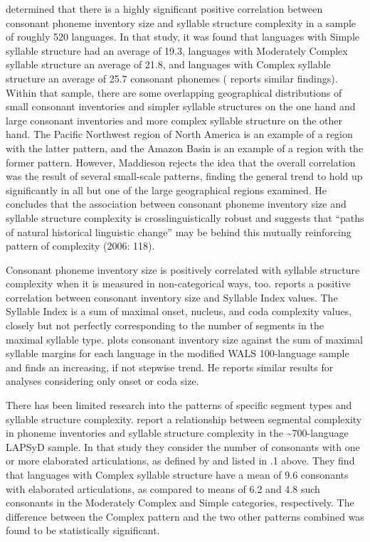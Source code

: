   \citet{Maddieson2006} determined that there is a highly significant positive correlation between consonant phoneme inventory size and syllable structure complexity in a sample of roughly 520 languages. In that study, it was found that languages with Simple syllable structure had an average of 19.3, languages with Moderately Complex syllable structure an average of 21.8, and languages with Complex syllable structure an average of 25.7 consonant phonemes (\citealt{Maddieson2013a} reports similar findings). Within that sample, there are some overlapping geographical distributions of small consonant inventories and simpler syllable structures on the one hand and large consonant inventories and more complex syllable structure on the other hand. The Pacific Northwest region of North America is an example of a region with the latter pattern, and the Amazon Basin is an example of a region with the former pattern. However, Maddieson rejects the idea that the overall correlation was the result of several small-scale patterns, finding the general trend to hold up significantly in all but one of the large geographical regions examined. He concludes that the association between consonant phoneme inventory size and syllable structure complexity is crosslinguistically robust and suggests that “paths of natural historical linguistic change” may be behind this mutually reinforcing pattern of complexity (2006: 118). 

  Consonant phoneme inventory size is positively correlated with syllable structure complexity when it is measured in non-categorical ways, too. \citet{Maddieson2011} reports a positive correlation between consonant inventory size and Syllable Index values. The Syllable Index is a sum of maximal onset, nucleus, and coda complexity values, closely but not perfectly corresponding to the number of segments in the maximal syllable type. \citet{Gordon2016} plots consonant inventory size against the sum of maximal syllable margins for each language in the modified WALS 100-language sample and finds an increasing, if not stepwise trend. He reports similar results for analyses considering only onset or coda size.

  There has been limited research into the patterns of specific segment types and syllable structure complexity. \citet{MaddiesonEtAl2013} report a relationship between segmental complexity in phoneme inventories and syllable structure complexity in the {\textasciitilde}700-language LAPSyD sample. In that study they consider the number of consonants with one or more elaborated articulations, as defined by \citet{LindblomMaddieson1988} and listed in .1 above. They find that languages with Complex syllable structure have a mean of 9.6 consonants with elaborated articulations, as compared to means of 6.2 and 4.8 such consonants in the Moderately Complex and Simple categories, respectively. The difference between the Complex pattern and the two other patterns combined was found to be statistically significant.


